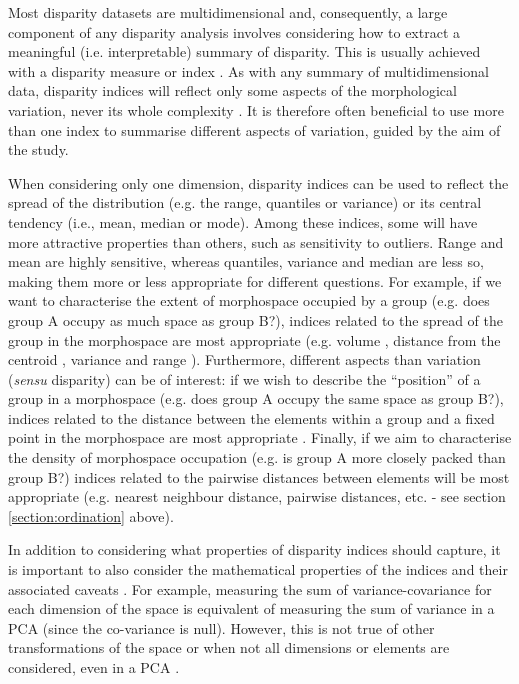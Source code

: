 \documentclass[12pt,letterpaper]{article}
\begin{document}
Most disparity datasets are multidimensional and, consequently, a large component of any disparity analysis involves considering how to extract a meaningful (i.e. interpretable) summary of disparity.
This is usually achieved with a disparity measure or index \citep{Hopkins2017-cf}.
As with any summary of multidimensional data, disparity indices will reflect only some aspects of the morphological variation, never its whole complexity \citep{GuillermeMOMS}.
It is therefore often beneficial to use more than one index to summarise different aspects of variation, guided by the aim of the study.

When considering only one dimension, disparity indices can be used to reflect the spread of the distribution (e.g. the range, quantiles or variance) or its central tendency (i.e., mean, median or mode).
Among these indices, some will have more attractive properties than others, such as sensitivity to outliers. Range and mean are highly sensitive, whereas quantiles, variance and median are less so, making them more or less appropriate for different questions.
For example, if we want to characterise the extent of morphospace occupied by a group (e.g. does group A occupy as much space as group B?), indices related to the spread of the group in the morphospace are most appropriate (e.g. volume
\citealt{Diaz2016-mr}, distance from the centroid \citealt{Hopkins2017-cf, Finlay2015-ft}, variance and range \citealt{Brusatte2008-fx}).
Furthermore, different aspects than variation (\textit{sensu} disparity) can be of interest: if we wish to describe the ``position'' of a group in a morphospace (e.g. does group A occupy the same space as group B?), indices related to the distance between the elements within a group and a fixed point in the morphospace are most appropriate \citep{GuillermeMOMS}.
Finally, if we aim to characterise the density of morphospace occupation (e.g. is group A more closely packed than group B?) indices related to the pairwise distances between elements will be most appropriate (e.g. nearest neighbour distance, pairwise distances, etc. \citealt{Close2015-qi} - see section \ref{section:ordination} above).

In addition to considering what properties of disparity indices should capture, it is important to also consider the mathematical properties of the indices and their associated caveats \citep{Wills2001-wh, Ciampaglio2001-iz}.
For example, measuring the sum of variance-covariance for each dimension of the space is equivalent of measuring the sum of variance in a PCA (since the co-variance is null).
However, this is not true of other transformations of the space or when not all dimensions or elements are considered, even in a PCA \citep{Legendre2012-va}.
\end{document}
